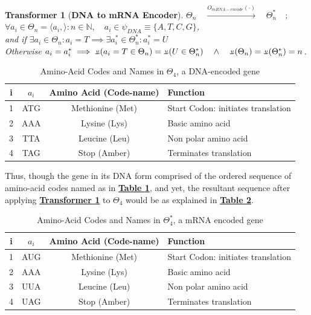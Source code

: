 \documentclass[a4paper, 18pt]{book} %
\newtheorem{transf}{Transformer}
\newcommand{\invpi}{\rotatebox[origin=c]{180}{$\pi$}}
\begin{document}
\begin{transf}[\textbf{DNA to mRNA Encoder}]
\label{TRANSF1}
$\Theta_n \quad \xrightarrow{O_{mRNA-encode}(\cdot)} \quad \Theta^*_n \quad;$\\
$\forall a_i \in \Theta_n = \langle a_i,\rangle:n \in \mathbb{N}, \quad a_i \in \psi_{DNA} \equiv \{A, T, C, G\}$,\\
and if $\exists a_i \in \Theta_n : a_i = T \implies \exists a_i^* \in \Theta^*_n: a_i^* = U$\\
Otherwise $a_i = a_i^* \implies \invpi(a_i = T \in \Theta_n) = \invpi(U \in \Theta^*_n) \quad \land \quad \invpi(\Theta_n) = \invpi(\Theta^*_n) = n$.

\end{transf}

\begin{table}[h]
  \centering
  \Large
	\begin{tabular}[t]{|c|c|c|p{3cm}|}
	\hline
	i & $a_i$ & \textbf{Amino Acid (Code-name)} & \textbf{Function}\\
	\hline
	\hline
	1 & ATG & Methionine (Met) & Start Codon: initiates translation\\
	\hline
	2 & AAA & Lysine (Lys) & Basic amino acid\\
	\hline
	3 & TTA & Leucine (Leu) & Non polar amino acid\\
	\hline
	4 & TAG & Stop (Amber) & Terminates translation\\
	
	\hline
	              
\end{tabular}
 \caption{Amino-Acid Codes and Names in $\Theta_4$, a DNA-encoded gene}
  \label{TAB1}
\end{table}

Thus, though the gene in its DNA form comprised of the ordered sequence of amino-acid codes named as in \textbf{\hyperref[TAB1]{Table \ref{TAB1}}}, and yet, the resultant sequence after applying \textbf{\hyperref[TRANSF1]{Transformer \ref{TRANSF1}}} to $\Theta_4$ would be as explained in \textbf{\hyperref[TAB2]{Table \ref{TAB2}}}.


\begin{table}[h]
  \centering
  \Large
	\begin{tabular}[t]{|c|c|c|p{3cm}|}
	\hline
	i & $a_i$ & \textbf{Amino Acid (Code-name)} & \textbf{Function}\\
	\hline
	\hline
	1 & AUG & Methionine (Met) & Start Codon: initiates translation\\
	\hline
	2 & AAA & Lysine (Lys) & Basic amino acid\\
	\hline
	3 & UUA & Leucine (Leu) & Non polar amino acid\\
	\hline
	4 & UAG & Stop (Amber) & Terminates translation\\
	
	\hline
	              
\end{tabular}
 \caption{Amino-Acid Codes and Names in $\Theta_4^*$, a mRNA encoded gene}
  \label{TAB2}
\end{table}
\end{document}
